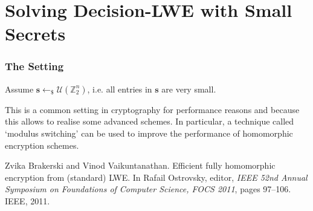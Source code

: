 \documentclass[10pt]{beamer}
\newcommand{\U}[1]{\ensuremath{\mathcal{U}(#1)\xspace}}
\renewcommand{\vec}[1]{\mathbf{#1}\xspace}
\newcommand{\Z}{\ensuremath{\mathbb{Z}}\xspace}
\newcommand{\sample}{\ensuremath{\leftarrow_{\$}}}
\begin{document}
\section{Solving Decision-LWE with Small Secrets}

\begin{frame}
\frametitle{The Setting}

Assume $\vec{s} \sample \U{\Z_2^n}$, i.e. all entries in $\vec{s}$ are very small.

\vspace{1em}

This is a common setting in cryptography for performance reasons and because this allows to realise some advanced schemes. In particular, a technique called `modulus switching' can be used to improve the performance of homomorphic encryption schemes.

\vspace{1em}

\begin{thebibliography}{foobar}
Zvika Brakerski and Vinod Vaikuntanathan.
\newblock Efficient fully homomorphic encryption from (standard) {LWE}.
\newblock In Rafail Ostrovsky, editor, {\em IEEE 52nd Annual Symposium on
  Foundations of Computer Science, FOCS 2011}, pages 97--106. IEEE, 2011.
\end{thebibliography}

\end{frame}
\end{document}
